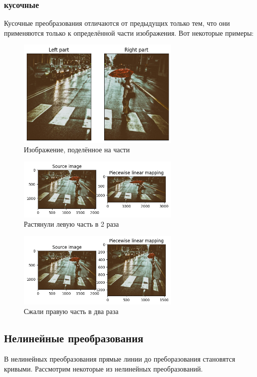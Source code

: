 \documentclass[a4paper,12pt]{article}
\begin{document}
\subsubsection{ кусочные}
Кусочные преобразования отличаются от предыдущих только тем, что они применяются только к определённой части изображения. Вот некоторые примеры:
\begin{figure}[H]
    \centering \includegraphics[width=0.7\textwidth]{my_images/26.png}
    \caption{Изображение, поделённое на части}
\end{figure}
\begin{figure}[H]
    \centering \includegraphics[width=0.7\textwidth]{my_images/27.png}
    \caption{Растянули левую часть в 2 раза}
\end{figure}
\begin{figure}[H]
    \centering \includegraphics[width=0.7\textwidth]{my_images/30.png}
    \caption{Сжали правую часть в два раза}
\end{figure}
\subsection{Нелинейные преобразования}
В нелинейных преобразования прямые линии до преборазования становятся кривыми. Рассмотрим некоторые из нелинейных преобразований. 
\end{document}
